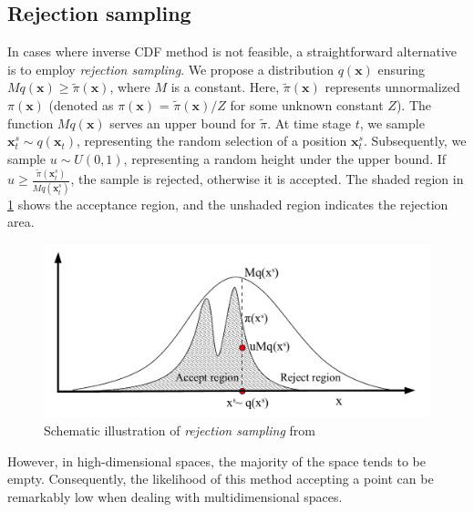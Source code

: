 \subsection{Rejection sampling}
In cases where inverse \acrshort{CDF} method is not feasible, a straightforward alternative is to employ \textit{rejection sampling}. We propose a distribution $q(\boldsymbol{x})$ ensuring $Mq(\boldsymbol{x}) \geq \tilde{\pi}(\boldsymbol{x})$, where $M$ is a constant. Here, $\tilde{\pi}(\boldsymbol{x})$ represents unnormalized $\pi(\boldsymbol{x})$ (denoted as $\pi(\boldsymbol{x})$ = $\tilde{\pi}(\boldsymbol{x})/Z$ for some unknown constant $Z$). The function $Mq(\boldsymbol{x})$ serves an upper bound for $\tilde{\pi}$. At time stage $t$, we sample $\boldsymbol{x}_{t}^{s} \sim q(\boldsymbol{x}_{t})$, representing the random selection of a position $\boldsymbol{x}_{t}^{s}$. Subsequently, we sample $u \sim U(0,1)$, representing a random height under the upper bound. If $u \geq \frac{\tilde{\pi}(\boldsymbol{x}_{t}^{s})}{Mq(\boldsymbol{x}_{t}^{s})}$, the sample is rejected, otherwise it is accepted. The shaded region in \cref{fig: rejectsampling} shows the acceptance region, and the unshaded region indicates the rejection area.
\begin{figure}[htbp]
    \centering
    \includegraphics[width = 140mm]{Figures/figure-rejectionsampling.pdf}
\caption{Schematic illustration of \textit{rejection sampling} from \protect\cite{andrieu2003}}
\label{fig: rejectsampling}
\end{figure}
However, in high-dimensional spaces, the majority of the space tends to be empty. Consequently, the likelihood of this method accepting a point can be remarkably low when dealing with multidimensional spaces.
